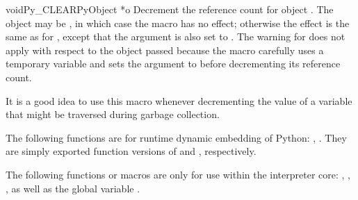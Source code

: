 \begin{cfuncdesc}{void}{Py_CLEAR}{PyObject *o}
  Decrement the reference count for object .  The object may be
  \NULL, in which case the macro has no effect; otherwise the effect
  is the same as for , except that the argument
  is also set to \NULL.  The warning for  does
  not apply with respect to the object passed because the macro
  carefully uses a temporary variable and sets the argument to \NULL
  before decrementing its reference count.

  It is a good idea to use this macro whenever decrementing the value
  of a variable that might be traversed during garbage collection.

\end{cfuncdesc}


The following functions are for runtime dynamic embedding of Python:
, .
They are simply exported function versions of  and 
, respectively.

The following functions or macros are only for use within the
interpreter core: ,
, , as
well as the global variable .
